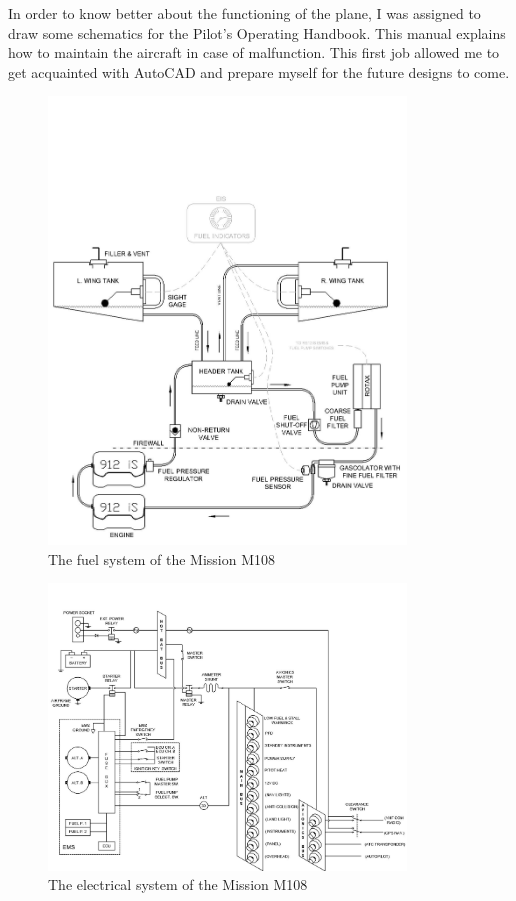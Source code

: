 \documentclass[11pt,a4paper]{article}
\begin{document}
In order to know better about the functioning of the plane, I was assigned to draw some schematics for the Pilot's Operating Handbook. This manual explains how to maintain the aircraft in case of malfunction. This first job allowed me to get acquainted with AutoCAD and prepare myself for the future designs to come. 

\begin{figure}[ht!]
	\begin{center}
		\includegraphics[width=9.5cm, trim = 0.5cm 1cm 0.5cm 12.5cm,clip]{pics/PIC004.jpg}
		\caption{The fuel system of the Mission M108}
		\label{fig:PIC004}
	\end{center}
\end{figure}
\begin{figure}[ht!]
	\begin{center}
		\includegraphics[width=9.5cm, trim = 0.5cm 0cm 0.5cm 2cm,clip]{pics/PIC005.jpg}
		\caption{The electrical system of the Mission M108}
		\label{fig:PIC005}
	\end{center}
\end{figure}
\end{document}
